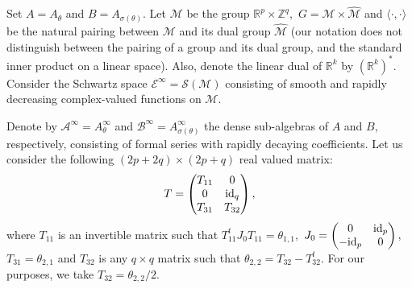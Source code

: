 \documentclass[9pt, BCOR=2mm]{amsart}
\numberwithin{equation}{section}
\numberwithin{equation}{section}
\begin{document}
Set $A=A_{\theta}$ and $B=A_{\sigma(\theta)}.$
Let $\mathcal{M}$ be the group $\mathbb{R}^{p}\times \mathbb{Z}^q,$ $G=\mathcal{M}\times\widehat{\mathcal{M}}$ and
$\langle\cdot,\cdot\rangle$ be the natural pairing between $\mathcal{M}$ and its dual group $\widehat{\mathcal{M}}$ (our notation does not distinguish between the pairing of a group and its dual group, and the standard inner product on a linear space). Also, denote the linear dual of $\mathbb{R}^{k}$ by $(\mathbb{R}^k)^*.$ Consider the Schwartz space $\mathcal{E}^{\infty}=\mathscr{S}(\mathcal{M})$ consisting of smooth and rapidly decreasing complex-valued functions on $\mathcal{M}.$

Denote by $\mathcal{A}^{\infty}=A_{\theta}^{\infty}$ and $\mathcal{B}^{\infty}=A_{\sigma(\theta)}^{\infty}$ the dense sub-algebras of $A$ and $B$, respectively, consisting of formal series with rapidly decaying coefficients. Let us consider the following $(2p+2q)\times(2p+q)$
real valued matrix:
\begin{eqnarray}T=\left(\begin{matrix}
                  T_{11} & 0 \\
                 0 & {\rm id}_q\\
                 T_{31}&T_{32}
                \end{matrix}
\right),\nonumber
\end{eqnarray}
where $T_{11}$ is an invertible matrix such that $T^{t}_{11}J_0 T_{11}=\theta_{1,1},$ $J_0=\left(\begin{matrix}
                  0 & {\rm id}_{p} \\
                 -{\rm id}_{p}& 0
                 \end{matrix}
\right),$
$T_{31}=\theta_{2,1}$ and $T_{32}$ is any $q\times q$ matrix such that
$\theta_{2,2}=T_{32}-T_{32}^t.$ For our purposes, we take $T_{32}=\theta_{2,2}\slash 2.$
\end{document}

